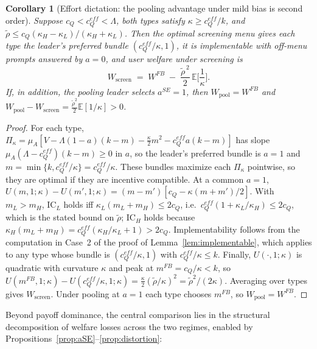 \documentclass[11pt]{article}
\newtheorem{corollary}{Corollary}
\begin{document}
\begin{corollary}[Effort dictation: the pooling advantage under mild bias is second order]
\label{cor:dictation}
Suppose $c_Q < c_Q^{eff} < \Lambda$, both types satisfy $\kappa \ge c_Q^{eff}/k$, and $\tilde\rho \le c_Q(\kappa_H - \kappa_L)/(\kappa_H + \kappa_L)$. Then the optimal screening menu gives each type the leader's preferred bundle $(c_Q^{eff}/\kappa, 1)$, it is implementable with off-menu prompts answered by $a = 0$, and user welfare under screening is
\[
W_{\text{screen}} \;=\; W^{FB} \;-\; \frac{\tilde\rho^{\,2}}{2}\,\mathbb{E}\Big[\frac{1}{\kappa}\Big].
\]
If, in addition, the pooling leader selects $a^{SE} = 1$, then $W_{\text{pool}} = W^{FB}$ and $W_{\text{pool}} - W_{\text{screen}} = \frac{\tilde\rho^{2}}{2}\mathbb{E}[1/\kappa] > 0$.
\end{corollary}

\begin{proof}
For each type, $\Pi_\kappa = \mu_A[V - \Lambda(1-a)(k-m) - \frac{\kappa}{2}m^2 - c_Q^{eff} a(k-m)]$ has slope $\mu_A(\Lambda - c_Q^{eff})(k-m) \ge 0$ in $a$, so the leader's preferred bundle is $a = 1$ and $m = \min\{k, c_Q^{eff}/\kappa\} = c_Q^{eff}/\kappa$. These bundles maximize each $\Pi_\kappa$ pointwise, so they are optimal if they are incentive compatible. At a common $a = 1$, $U(m,1;\kappa) - U(m',1;\kappa) = (m - m')[c_Q - \kappa(m + m')/2]$. With $m_L > m_H$, $\text{IC}_L$ holds iff $\kappa_L(m_L + m_H) \le 2c_Q$, i.e.\ $c_Q^{eff}(1 + \kappa_L/\kappa_H) \le 2c_Q$, which is the stated bound on $\tilde\rho$; $\text{IC}_H$ holds because $\kappa_H(m_L + m_H) = c_Q^{eff}(\kappa_H/\kappa_L + 1) > 2c_Q$. Implementability follows from the computation in Case~2 of the proof of Lemma~\ref{lem:implementable}, which applies to any type whose bundle is $(c_Q^{eff}/\kappa, 1)$ with $c_Q^{eff}/\kappa \le k$. Finally, $U(\cdot,1;\kappa)$ is quadratic with curvature $\kappa$ and peak at $m^{FB} = c_Q/\kappa < k$, so $U(m^{FB},1;\kappa) - U(c_Q^{eff}/\kappa,1;\kappa) = \frac{\kappa}{2}(\tilde\rho/\kappa)^2 = \tilde\rho^2/(2\kappa)$. Averaging over types gives $W_{\text{screen}}$. Under pooling at $a = 1$ each type chooses $m^{FB}$, so $W_{\text{pool}} = W^{FB}$.
\end{proof}

Beyond payoff dominance, the central comparison lies in the structural decomposition
of welfare losses across the two regimes, enabled by Propositions~\ref{prop:aSE}--\ref{prop:distortion}:
\end{document}
